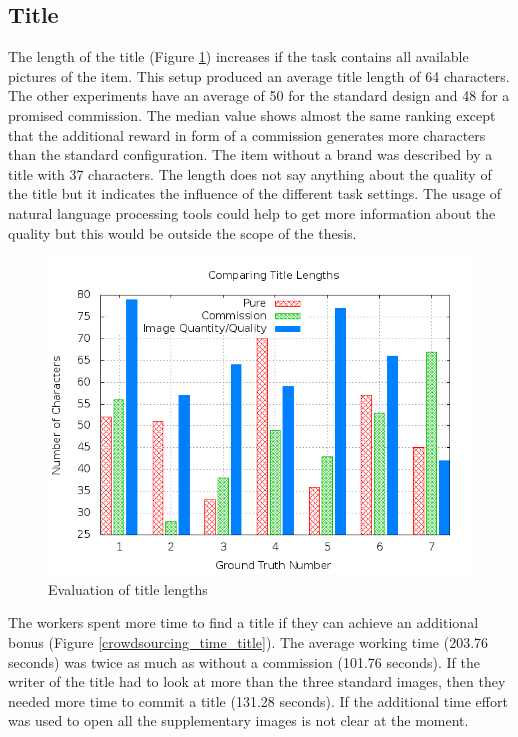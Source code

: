 \subsection{Title}
The length of the title (Figure \ref{crowdsourcing_title_length}) increases if the task contains all available pictures of the item. This setup produced an average title length of 64 characters. The other experiments have an average of 50 for the standard design and 48 for a promised commission. The median value shows almost the same ranking except that the additional reward in form of a commission generates more characters than the standard configuration. The item without a brand was described by a title with 37 characters. The length does not say anything about the quality of the title but it indicates the influence of the different task settings. The usage of natural language processing tools could help to get more information about the quality but this would be outside the scope of the thesis.
\begin{figure}
\centering
\includegraphics[scale=0.55]{images/plots/crowdsourcing/plot_title_length.png}
\caption{Evaluation of title lengths}
\label{crowdsourcing_title_length}
\end{figure}
The workers spent more time to find a title if they can achieve an additional bonus (Figure \ref{crowdsourcing_time_title}). The average working time (203.76 seconds) was twice as much as without a commission (101.76 seconds). If the writer of the title had to look at more than the three standard images, then they needed more time to commit a title (131.28 seconds). If the additional time effort was used to open all the supplementary images is not clear at the moment.

